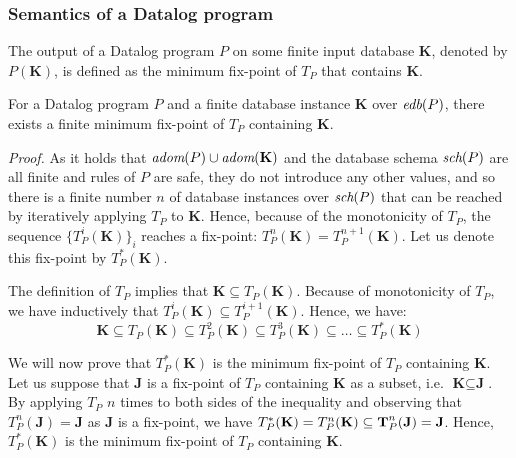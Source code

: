\subsubsection{Semantics of a Datalog program}
The output of a Datalog program $P$ on some finite input database $\textbf{K}$, denoted by $P(\textbf{K})$, is defined as the minimum fix-point of $T_P$ that contains $\textbf{K}$.

\begin{thm}\label{t:datalogfixpointsem}
For a Datalog program $P$ and a finite database instance $\textbf{K}$ over $\textit{edb}(P)$, there exists a finite minimum fix-point of $T_P$ containing $\textbf{K}$.
\end{thm}
\emph{Proof.}
As it holds that $\textit{adom}(P) \cup \textit{adom}(\textbf{K})$ and the database schema $\textit{sch}(P)$ are all finite and rules of $P$ are safe, they do not introduce any other values, and so there is a finite number $n$ of database instances over $\textit{sch}(P)$ that can be reached by iteratively applying $T_P$ to $\textbf{K}$. Hence, because of the monotonicity of $T_P$, the sequence $\{T_P^i(\textbf{K})\}_i$ reaches a fix-point: $T_P^n(\textbf{K}) = T_P^{n+1}(\textbf{K})$. Let us denote this fix-point by $T_P^*(\textbf{K})$.

The definition of $T_P$ implies that $\textbf{K} \subseteq T_P(\textbf{K})$.
Because of monotonicity of $T_P$, we have inductively that $T_P^i(\textbf{K}) \subseteq T_P^{i+1}(\textbf{K})$.
Hence, we have:
$$\textbf{K} \subseteq T_P(\textbf{K}) \subseteq T_P^2(\textbf{K}) \subseteq T_P^3(\textbf{K}) \subseteq \dots \subseteq T_P^*(\textbf{K})$$

We will now prove that $T_P^*(\textbf{K})$ is the minimum fix-point of $T_P$ containing $\textbf{K}$. Let us suppose that $\textbf{J}$ is a fix-point of $T_P$ containing  $\textbf{K}$ as a subset, i.e.  $\textbf{K} \subseteq \textbf{J}$. By applying $T_P$ $n$ times to both sides of the inequality and observing that $T_P^n(\textbf{J}) = \textbf{J}$ as $\textbf{J}$ is a fix-point, we have $T_P^*(\textbf{K}) = T_P^n(\textbf{K}) \subseteq \textbf T_P^n(\textbf{J}) = \textbf{J}$. Hence, $T_P^*(\textbf{K})$ is the minimum fix-point of $T_P$ containing $\textbf{K}$.


